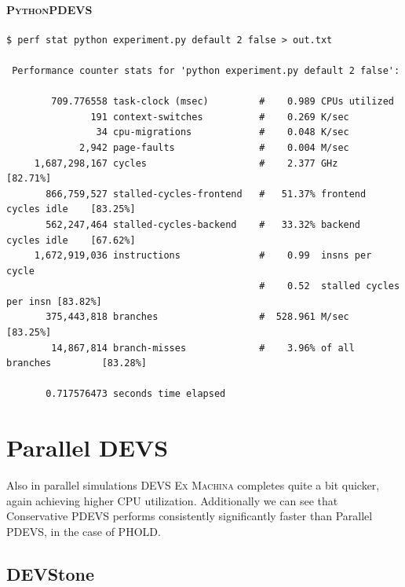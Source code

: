 \documentclass[8pt,a4paper]{report}
\begin{document}
\paragraph{\textsc{PythonPDEVS}}
\begin{Verbatim}[fontsize=\small]
$ perf stat python experiment.py default 2 false > out.txt

 Performance counter stats for 'python experiment.py default 2 false':

        709.776558 task-clock (msec)         #    0.989 CPUs utilized          
               191 context-switches          #    0.269 K/sec                  
                34 cpu-migrations            #    0.048 K/sec                  
             2,942 page-faults               #    0.004 M/sec                  
     1,687,298,167 cycles                    #    2.377 GHz                     [82.71%]
       866,759,527 stalled-cycles-frontend   #   51.37% frontend cycles idle    [83.25%]
       562,247,464 stalled-cycles-backend    #   33.32% backend  cycles idle    [67.62%]
     1,672,919,036 instructions              #    0.99  insns per cycle        
                                             #    0.52  stalled cycles per insn [83.82%]
       375,443,818 branches                  #  528.961 M/sec                   [83.25%]
        14,867,814 branch-misses             #    3.96% of all branches         [83.28%]

       0.717576473 seconds time elapsed
\end{Verbatim}

\section{Parallel DEVS}
Also in parallel simulations \textsc{DEVS Ex Machina} completes quite a bit quicker, again achieving higher CPU utilization.
Additionally we can see that Conservative PDEVS performs consistently significantly faster than Parallel PDEVS, in the case of PHOLD.

\subsection{DEVStone}
\end{document}
